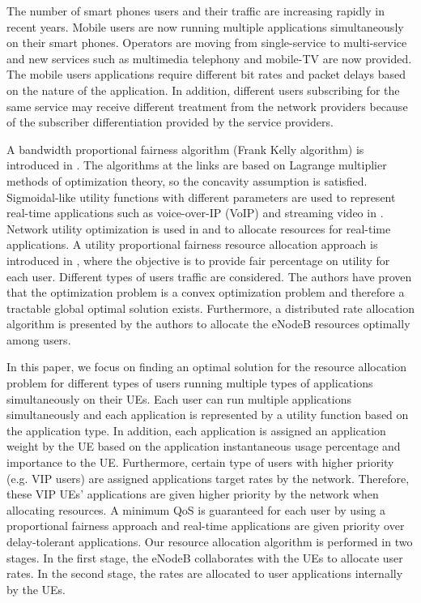 \documentclass[journal]{IEEEtran} 				\IEEEoverridecommandlockouts 						\usepackage{amsmath,amssymb}
\begin{document}
The number of smart phones users and their traffic are increasing rapidly in recent years. Mobile users are now running multiple applications simultaneously on their smart phones. Operators are moving from single-service to multi-service and new services such as multimedia telephony and mobile-TV are now provided. The mobile users applications require different bit rates and packet delays based on the nature of the application. In addition, different users subscribing for the same service may receive different treatment from the network providers \cite{QoScontrol} because of the subscriber differentiation provided by the service providers.

A bandwidth proportional fairness algorithm (Frank Kelly algorithm) is introduced in \cite{kelly98ratecontrol}. The algorithms at the links are based on Lagrange multiplier methods of optimization theory, so the concavity assumption is satisfied. Sigmoidal-like utility functions with different parameters are used to represent real-time applications such as voice-over-IP (VoIP) and streaming video in \cite{Fundamental}.
Network utility optimization is used in \cite{RebeccaThesis} and \cite{DL_PowerAllocation} to allocate resources for real-time applications. A utility proportional fairness resource allocation approach is introduced in \cite{Ahmed_Utility1}, where the objective is to provide fair percentage on utility for each user. Different types of users traffic are considered. The authors have proven that the optimization problem is a convex optimization problem and therefore a tractable global optimal solution exists. Furthermore, a distributed rate allocation algorithm is presented by the authors to allocate the eNodeB resources optimally among users.

In this paper, we focus on finding an optimal solution for the resource allocation problem for different types of users running multiple types of applications simultaneously on their UEs. Each user can run multiple applications simultaneously and each application is represented by a utility function based on the application type. In addition, each application is assigned an application weight by the UE based on the application instantaneous usage percentage and importance to the UE. Furthermore, certain type of users with higher priority (e.g. VIP users) are assigned applications target rates by the network. Therefore, these VIP UEs' applications are given higher priority by the network when allocating resources. A minimum QoS is guaranteed for each user by using a proportional fairness approach and real-time applications are given priority over delay-tolerant applications.
Our resource allocation algorithm is performed in two stages. In the first stage, the eNodeB collaborates with the UEs to allocate user rates. In the second stage, the rates are allocated to user applications internally by the UEs.
\end{document}
